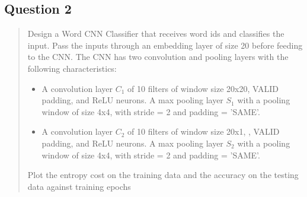 \subsection{Question 2}
\label{2q2}
\begin{quote}
Design a Word CNN Classifier that receives word ids and classifies the input. Pass the inputs
through an embedding layer of size 20 before feeding to the CNN. The CNN has two
convolution and pooling layers with the following characteristics:
\begin{itemize}
    \item A convolution layer $C_1$  of 10 filters of window size 20x20, VALID padding, and ReLU neurons. A max pooling layer $S_1$ with a pooling window of size 4x4, with stride = 2 and padding = 'SAME'.
    \item A convolution layer $C_2$ of 10 filters of window size 20x1, , VALID padding, and ReLU neurons. A max pooling layer $S_2$ with a pooling window of size 4x4, with stride = 2 and padding = 'SAME'.
\end{itemize}
Plot the entropy cost on the training data and the accuracy on the testing data against training epochs
\end{quote}
